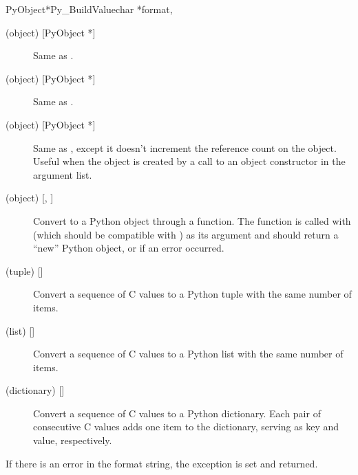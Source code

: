 \begin{cfuncdesc}{PyObject*}{Py_BuildValue}{char *format,
                                            \moreargs}
\begin{description}
    \item[ (object) {[PyObject *]}]
    Same as .

    \item[ (object) {[PyObject *]}]
    Same as .

    \item[ (object) {[PyObject *]}]
    Same as , except it doesn't increment the reference count
    on the object.  Useful when the object is created by a call to an
    object constructor in the argument list.

    \item[ (object) {[, ]}]
    Convert  to a Python object through a
     function.  The function is called with
     (which should be compatible with ) as
    its argument and should return a ``new'' Python object, or \NULL{}
    if an error occurred.

    \item[ (tuple) {[]}]
    Convert a sequence of C values to a Python tuple with the same
    number of items.

    \item[ (list) {[]}]
    Convert a sequence of C values to a Python list with the same
    number of items.

    \item[ (dictionary) {[]}]
    Convert a sequence of C values to a Python dictionary.  Each pair
    of consecutive C values adds one item to the dictionary, serving
    as key and value, respectively.

  \end{description}

  If there is an error in the format string, the
   exception is set and \NULL{} returned.
\end{cfuncdesc}
